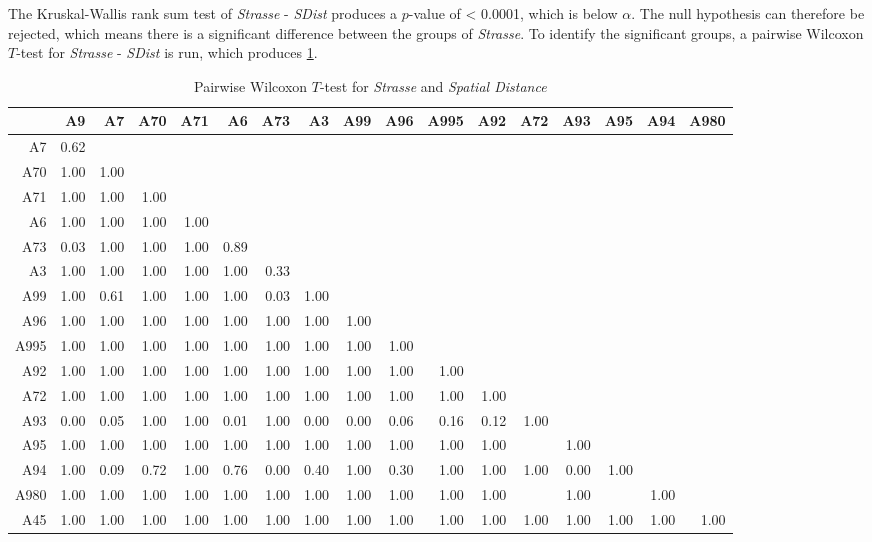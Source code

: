 The Kruskal-Wallis rank sum test of \textit{Strasse} - \textit{SDist} produces a $p$-value of < 0.0001, which is below $\alpha$. The null hypothesis can therefore be rejected, which means there is a significant difference between the groups of \textit{Strasse}. To identify the significant groups, a pairwise Wilcoxon $T$-test for \textit{Strasse} - \textit{SDist} is run, which produces \cref{tbl:wilcoxon_arbis_matched_Strasse_SDist}. 
\begin{table}[ht!]
	\tiny
	\setlength{\tabcolsep}{4pt}
	\centering
	\begin{tabular}{rrrrrrrrrrrrrrrrr}
		\hline
			& A9 & A7 & A70 & A71 & A6 & A73 & A3 & A99 & A96 & A995 & A92 & A72 & A93 & A95 & A94 & A980 \\ 
		\hline
		A7   & 0.62 &  &  &  &  &  &  &  &  &  &  &  &  &  &  &  \\ 
		A70  & 1.00 & 1.00 &  &  &  &  &  &  &  &  &  &  &  &  &  &  \\ 
		A71  & 1.00 & 1.00 & 1.00 &  &  &  &  &  &  &  &  &  &  &  &  &  \\ 
		A6   & 1.00 & 1.00 & 1.00 & 1.00 &  &  &  &  &  &  &  &  &  &  &  &  \\ 
		A73  & 0.03 & 1.00 & 1.00 & 1.00 & 0.89 &  &  &  &  &  &  &  &  &  &  &  \\ 
		A3   & 1.00 & 1.00 & 1.00 & 1.00 & 1.00 & 0.33 &  &  &  &  &  &  &  &  &  &  \\ 
		A99  & 1.00 & 0.61 & 1.00 & 1.00 & 1.00 & 0.03 & 1.00 &  &  &  &  &  &  &  &  &  \\ 
		A96  & 1.00 & 1.00 & 1.00 & 1.00 & 1.00 & 1.00 & 1.00 & 1.00 &  &  &  &  &  &  &  &  \\ 
		A995 & 1.00 & 1.00 & 1.00 & 1.00 & 1.00 & 1.00 & 1.00 & 1.00 & 1.00 &  &  &  &  &  &  &  \\ 
		A92  & 1.00 & 1.00 & 1.00 & 1.00 & 1.00 & 1.00 & 1.00 & 1.00 & 1.00 & 1.00 &  &  &  &  &  &  \\ 
		A72  & 1.00 & 1.00 & 1.00 & 1.00 & 1.00 & 1.00 & 1.00 & 1.00 & 1.00 & 1.00 & 1.00 &  &  &  &  &  \\ 
		A93  & 0.00 & 0.05 & 1.00 & 1.00 & 0.01 & 1.00 & 0.00 & 0.00 & 0.06 & 0.16 & 0.12 & 1.00 &  &  &  &  \\ 
		A95  & 1.00 & 1.00 & 1.00 & 1.00 & 1.00 & 1.00 & 1.00 & 1.00 & 1.00 & 1.00 & 1.00 &  & 1.00 &  &  &  \\ 
		A94  & 1.00 & 0.09 & 0.72 & 1.00 & 0.76 & 0.00 & 0.40 & 1.00 & 0.30 & 1.00 & 1.00 & 1.00 & 0.00 & 1.00 &  &  \\ 
		A980 & 1.00 & 1.00 & 1.00 & 1.00 & 1.00 & 1.00 & 1.00 & 1.00 & 1.00 & 1.00 & 1.00 &  & 1.00 &  & 1.00 &  \\ 
		A45  & 1.00 & 1.00 & 1.00 & 1.00 & 1.00 & 1.00 & 1.00 & 1.00 & 1.00 & 1.00 & 1.00 & 1.00 & 1.00 & 1.00 & 1.00 & 1.00 \\ 
		\bottomrule
	\end{tabular}
	\caption{Pairwise Wilcoxon $T$-test for \textit{Strasse} and \textit{Spatial Distance}}
	\label{tbl:wilcoxon_arbis_matched_Strasse_SDist}
\end{table}
